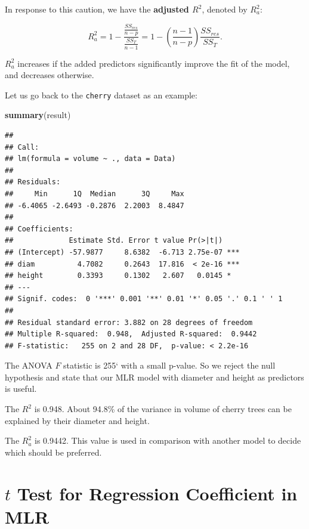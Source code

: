 \documentclass[
]{book}
\newenvironment{Shaded}{\begin{snugshade}}{\end{snugshade}}
\newcommand{\FunctionTok}[1]{\textcolor[rgb]{0.13,0.29,0.53}{\textbf{#1}}}
\newcommand{\NormalTok}[1]{#1}
\begin{document}
In response to this caution, we have the \textbf{adjusted \(R^2\)}, denoted by \(R_{a}^{2}\):

\begin{equation} 
R_{a}^{2} = 1 - \frac{\frac{SS_{res}}{n-p}}{\frac{SS_T}{n-1}} = 1 - \left(\frac{n-1}{n-p} \right) \frac{SS_{res}}{SS_T}.
\label{eq:6adjusted}
\end{equation}

\(R_{a}^{2}\) increases if the added predictors significantly improve the fit of the model, and decreases otherwise.

Let us go back to the \texttt{cherry} dataset as an example:

\begin{Shaded}
\begin{Highlighting}[]
\FunctionTok{summary}\NormalTok{(result)}
\end{Highlighting}
\end{Shaded}

\begin{verbatim}
## 
## Call:
## lm(formula = volume ~ ., data = Data)
## 
## Residuals:
##     Min      1Q  Median      3Q     Max 
## -6.4065 -2.6493 -0.2876  2.2003  8.4847 
## 
## Coefficients:
##             Estimate Std. Error t value Pr(>|t|)    
## (Intercept) -57.9877     8.6382  -6.713 2.75e-07 ***
## diam          4.7082     0.2643  17.816  < 2e-16 ***
## height        0.3393     0.1302   2.607   0.0145 *  
## ---
## Signif. codes:  0 '***' 0.001 '**' 0.01 '*' 0.05 '.' 0.1 ' ' 1
## 
## Residual standard error: 3.882 on 28 degrees of freedom
## Multiple R-squared:  0.948,  Adjusted R-squared:  0.9442 
## F-statistic:   255 on 2 and 28 DF,  p-value: < 2.2e-16
\end{verbatim}

The ANOVA \(F\) statistic is 255` with a small p-value. So we reject the null hypothesis and state that our MLR model with diameter and height as predictors is useful.

The \(R^2\) is 0.948. About 94.8\% of the variance in volume of cherry trees can be explained by their diameter and height.

The \(R_{a}^{2}\) is 0.9442. This value is used in comparison with another model to decide which should be preferred.

\hypertarget{t-test-for-regression-coefficient-in-mlr}{%
\section{\texorpdfstring{\(t\) Test for Regression Coefficient in MLR}{t Test for Regression Coefficient in MLR}}\label{t-test-for-regression-coefficient-in-mlr}}
\end{document}

